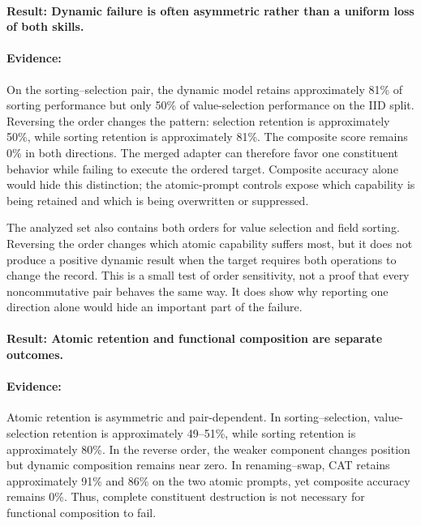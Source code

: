 \documentclass[10pt,twocolumn]{article}
\begin{document}
\paragraph{Result: Dynamic failure is often asymmetric rather than a uniform loss of both skills.}

\paragraph{Evidence:} On the sorting--selection pair, the dynamic model retains approximately 81\% of sorting performance but only 50\% of value-selection performance on the IID split. Reversing the order changes the pattern: selection retention is approximately 50\%, while sorting retention is approximately 81\%. The composite score remains 0\% in both directions. The merged adapter can therefore favor one constituent behavior while failing to execute the ordered target. Composite accuracy alone would hide this distinction; the atomic-prompt controls expose which capability is being retained and which is being overwritten or suppressed.

The analyzed set also contains both orders for value selection and field sorting. Reversing the order changes which atomic capability suffers most, but it does not produce a positive dynamic result when the target requires both operations to change the record. This is a small test of order sensitivity, not a proof that every noncommutative pair behaves the same way. It does show why reporting one direction alone would hide an important part of the failure.

\paragraph{Result: Atomic retention and functional composition are separate outcomes.}

\paragraph{Evidence:} Atomic retention is asymmetric and pair-dependent. In sorting--selection, value-selection retention is approximately 49--51\%, while sorting retention is approximately 80\%. In the reverse order, the weaker component changes position but dynamic composition remains near zero. In renaming--swap, CAT retains approximately 91\% and 86\% on the two atomic prompts, yet composite accuracy remains 0\%. Thus, complete constituent destruction is not necessary for functional composition to fail.
\end{document}
